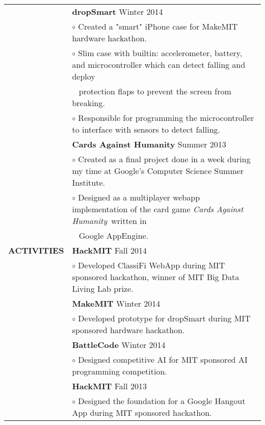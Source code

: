\documentclass[11pt,letterpaper]{article}
\begin{document}
\begin{tabular}{@{}lp{6.6in}}
&\textbf{dropSmart} \hfill Winter 2014\\
&\hspace{10pt}$\circ$ Created a "smart" iPhone case for MakeMIT hardware hackathon.\\ 
&\hspace{10pt}$\circ$ Slim case with builtin: accelerometer, battery, and microcontroller which can detect falling and deploy\\
&\ \hspace{3ex} protection flaps to prevent the screen from breaking.\\
&\hspace{10pt}$\circ$ Responsible for programming the microcontroller to interface with sensors to detect falling.\\

&\textbf{Cards Against Humanity} \hfill Summer 2013\\
&\hspace{10pt}$\circ$ Created as a final project done in a week during my time at Google's Computer Science Summer Institute.\\
&\hspace{10pt}$\circ$ Designed as  a multiplayer webapp implementation of the card game \emph{Cards Against Humanity}\ written in\\ &\ \hspace{3ex} Google AppEngine.\\

\textbf{ACTIVITIES}
&\textbf{HackMIT} \hfill Fall 2014\\
&\hspace{10pt}$\circ$ Developed ClassiFi WebApp during MIT sponsored hackathon, winner of MIT Big Data Living Lab prize.\\
&\textbf{MakeMIT} \hfill Winter 2014\\
&\hspace{10pt}$\circ$ Developed prototype for dropSmart during MIT sponsored hardware hackathon. \\
&\textbf{BattleCode} \hfill Winter 2014\\
&\hspace{10pt}$\circ$ Designed competitive AI for MIT sponsored AI programming competition. \\
&\textbf{HackMIT} \hfill Fall 2013\\
&\hspace{10pt}$\circ$ Designed the foundation for a Google Hangout App during MIT sponsored hackathon.\\
\end{tabular}
\end{document}
